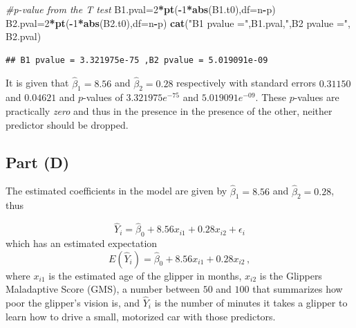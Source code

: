 \documentclass[
]{article}
\newenvironment{Shaded}{\begin{snugshade}}{\end{snugshade}}
\newcommand{\AttributeTok}[1]{\textcolor[rgb]{0.13,0.29,0.53}{#1}}
\newcommand{\CommentTok}[1]{\textcolor[rgb]{0.56,0.35,0.01}{\textit{#1}}}
\newcommand{\DecValTok}[1]{\textcolor[rgb]{0.00,0.00,0.81}{#1}}
\newcommand{\FunctionTok}[1]{\textcolor[rgb]{0.13,0.29,0.53}{\textbf{#1}}}
\newcommand{\NormalTok}[1]{#1}
\newcommand{\OtherTok}[1]{\textcolor[rgb]{0.56,0.35,0.01}{#1}}
\newcommand{\SpecialCharTok}[1]{\textcolor[rgb]{0.81,0.36,0.00}{\textbf{#1}}}
\newcommand{\StringTok}[1]{\textcolor[rgb]{0.31,0.60,0.02}{#1}}
\begin{document}
\begin{Shaded}
\begin{Highlighting}[]
\CommentTok{\#p{-}value from the T test}
\NormalTok{B1.pval}\OtherTok{=}\DecValTok{2}\SpecialCharTok{*}\FunctionTok{pt}\NormalTok{(}\SpecialCharTok{{-}}\DecValTok{1}\SpecialCharTok{*}\FunctionTok{abs}\NormalTok{(B1.t0),}\AttributeTok{df=}\NormalTok{n}\SpecialCharTok{{-}}\NormalTok{p)}
\NormalTok{B2.pval}\OtherTok{=}\DecValTok{2}\SpecialCharTok{*}\FunctionTok{pt}\NormalTok{(}\SpecialCharTok{{-}}\DecValTok{1}\SpecialCharTok{*}\FunctionTok{abs}\NormalTok{(B2.t0),}\AttributeTok{df=}\NormalTok{n}\SpecialCharTok{{-}}\NormalTok{p)}
\FunctionTok{cat}\NormalTok{(}\StringTok{"B1 pvalue ="}\NormalTok{,B1.pval,}\StringTok{",B2 pvalue ="}\NormalTok{, B2.pval)}
\end{Highlighting}
\end{Shaded}

\begin{verbatim}
## B1 pvalue = 3.321975e-75 ,B2 pvalue = 5.019091e-09
\end{verbatim}

It is given that \(\hat\beta_1 = 8.56\) and \(\hat\beta_2 = 0.28\)
respectively with standard errors \(0.31150\) and \(0.04621\) and
\(p\)-values of \(3.321975e^{-75}\) and \(5.019091e^{-09}\). These
\(p\)-values are practically \emph{zero} and thus in the presence in the
presence of the other, neither predictor should be dropped.

\hypertarget{part-d-1}{%
\subsection{Part (D)}\label{part-d-1}}


The estimated coefficients in the model are given by
\(\hat\beta_1 = 8.56\) and \(\hat\beta_2 = 0.28\), thus

\begin{equation}
\hat{Y}_i = \hat\beta_0 + 8.56 x_{i 1} + 0.28 x_{i 2} + \epsilon_i
\end{equation} which has an estimated expectation \begin{equation}
E(\hat{Y}_i) = \hat\beta_0 + 8.56 x_{i 1} + 0.28 x_{i 2}\,,
\end{equation} where \(x_{i 1}\) is the estimated age of the glipper in
months, \(x_{i 2}\) is the Glippers Maladaptive Score (GMS), a number
between \(50\) and \(100\) that summarizes how poor the glipper's vision
is, and \(\hat{Y}_i\) is the number of minutes it takes a glipper to
learn how to drive a small, motorized car with those predictors.
\end{document}
